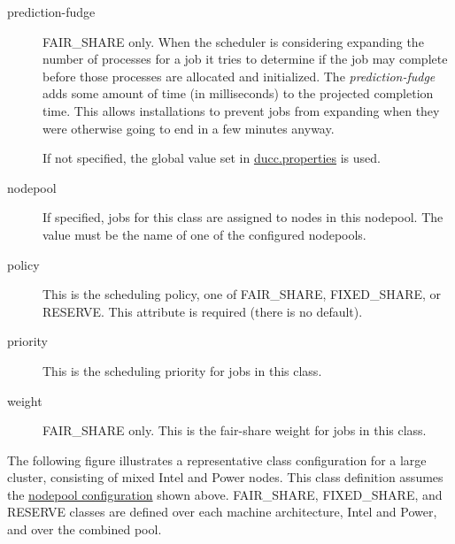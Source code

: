 \begin{description}
      \item[prediction-fudge] FAIR\_SHARE only. When the scheduler is considering expanding the
        number of processes for a job it tries to determine if the job may complete before those
        processes are allocated and initialized.  The {\em prediction-fudge} adds some amount of 
        time (in milliseconds) to the projected completion time.  This allows installations to
        prevent jobs from expanding when they were otherwise going to end in a few minutes
        anyway.

        If not specified, the global value set in \hyperref[sec:ducc.properties]{ducc.properties} is used.

      \item[nodepool] If specified, jobs for this class are assigned to nodes in this nodepool. The
        value must be the name of one of the configured nodepools.

      \item[policy] This is the scheduling policy, one of FAIR\_SHARE, FIXED\_SHARE, or RESERVE. This
        attribute is required (there is no default).

      \item[priority] This is the scheduling priority for jobs in this class.

      \item[weight] FAIR\_SHARE only. This is the fair-share weight for jobs in this class.
      
    \end{description}

    The following figure illustrates a representative class configuration for a large cluster,
    consisting of mixed Intel and Power nodes.  This class definition assumes the
    \hyperref[fig:nodepool.configuration]{nodepool configuration} shown above.  FAIR\_SHARE,
    FIXED\_SHARE, and RESERVE classes are defined over each machine architecture, Intel and Power,
    and over the combined pool. 

